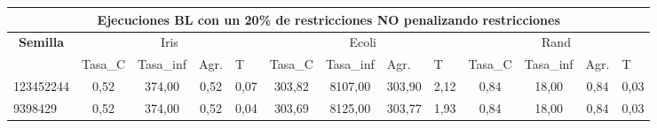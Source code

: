 \documentclass[12pt, spanish]{article}
\begin{document}
\begin{table}[H]
\small

\begin{adjustwidth}{-1cm}{-1cm}%

\begin{tabular}{|l|c|c|c|c|c|c|c|c|c|c|c|c|}
\hline
\multicolumn{13}{|c|}{\textbf{Ejecuciones BL con un 20\% de restricciones NO penalizando restricciones}}                                                                                                                                                                                                                                                                                                               \\ \hline
\multicolumn{1}{|c|}{\multirow{2}{*}{\textbf{Semilla}}} & \multicolumn{4}{c|}{Iris}                                                                                          & \multicolumn{4}{c|}{Ecoli}                                                                                         & \multicolumn{4}{c|}{Rand}                                                                                          \\ \cline{2-13} 
\multicolumn{1}{|c|}{}                                  & \multicolumn{1}{l|}{Tasa\_C} & \multicolumn{1}{l|}{Tasa\_inf} & \multicolumn{1}{l|}{Agr.} & \multicolumn{1}{l|}{T} & \multicolumn{1}{l|}{Tasa\_C} & \multicolumn{1}{l|}{Tasa\_inf} & \multicolumn{1}{l|}{Agr.} & \multicolumn{1}{l|}{T} & \multicolumn{1}{l|}{Tasa\_C} & \multicolumn{1}{l|}{Tasa\_inf} & \multicolumn{1}{l|}{Agr.} & \multicolumn{1}{l|}{T} \\ \hline
123452244                                               & 0,52                         & 374,00                         & 0,52                      & 0,07                   & 303,82                       & 8107,00                        & 303,90                    & 2,12                   & 0,84                         & 18,00                          & 0,84                      & 0,03                   \\ \hline
9398429                                                 & 0,52                         & 374,00                         & 0,52                      & 0,04                   & 303,69                       & 8125,00                        & 303,77                    & 1,93                   & 0,84                         & 18,00                          & 0,84                      & 0,03                   \\ \hline

\end{tabular}
\end{adjustwidth}
\end{table}
\end{document}
